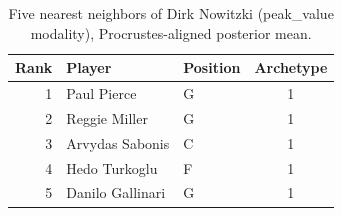 \begin{table}[htbp]
  \centering\small
  \begin{tabular}{rllc}
    \toprule
    Rank & Player & Position & Archetype \\
    \midrule
    1 & Paul Pierce & G & 1 \\
    2 & Reggie Miller & G & 1 \\
    3 & Arvydas Sabonis & C & 1 \\
    4 & Hedo Turkoglu & F & 1 \\
    5 & Danilo Gallinari & G & 1 \\
    \bottomrule
  \end{tabular}
  \caption{Five nearest neighbors of Dirk Nowitzki (peak_value modality), Procrustes-aligned posterior mean.}
  \label{tab:Dirk_Nowitzki_neighbors_peak_value}
\end{table}


